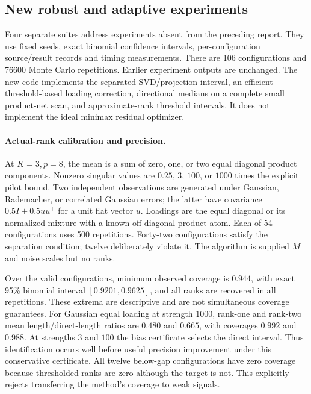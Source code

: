 \subsection{New robust and adaptive experiments}\label{sec:robust_experiments}

Four separate suites address experiments absent from the preceding report. They use fixed seeds, exact binomial confidence intervals, per-configuration source/result records and timing measurements. There are 106 configurations and 76600 Monte Carlo repetitions. Earlier experiment outputs are unchanged. The new code implements the separated SVD/projection interval, an efficient threshold-based loading correction, directional medians on a complete small product-net scan, and approximate-rank threshold intervals. It does not implement the ideal minimax residual optimizer.

\paragraph{Actual-rank calibration and precision.}
At $K=3,p=8$, the mean is a sum of zero, one, or two equal diagonal product components. Nonzero singular values are $0.25$, $3$, $100$, or $1000$ times the explicit pilot bound. Two independent observations are generated under Gaussian, Rademacher, or correlated Gaussian errors; the latter have covariance $0.5I+0.5uu^\top$ for a unit flat vector $u$. Loadings are the equal diagonal or its normalized mixture with a known off-diagonal product atom. Each of 54 configurations uses 500 repetitions. Forty-two configurations satisfy the separation condition; twelve deliberately violate it. The algorithm is supplied $M$ and noise scales but no ranks.

Over the valid configurations, minimum observed coverage is $0.944$, with exact 95\% binomial interval $[0.9201,0.9625]$, and all ranks are recovered in all repetitions. These extrema are descriptive and are not simultaneous coverage guarantees. For Gaussian equal loading at strength $1000$, rank-one and rank-two mean length/direct-length ratios are $0.480$ and $0.665$, with coverages $0.992$ and $0.988$. At strengths $3$ and $100$ the bias certificate selects the direct interval. Thus identification occurs well before useful precision improvement under this conservative certificate. All twelve below-gap configurations have zero coverage because thresholded ranks are zero although the target is not. This explicitly rejects transferring the method's coverage to weak signals.

